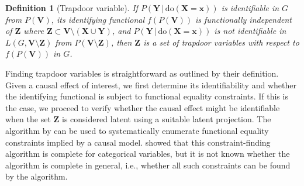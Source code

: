 \documentclass{statsoc}
\newcommand{\+}[1]{\ensuremath{\mathbf{#1}}}
\newtheorem{definition}{Definition}
\newcommand{\doo}{\textrm{do}}
\newcommand{\given}{{ \, | \, }}
\newcommand{\z}{trapdoor variable}
\begin{document}
\begin{definition}[Trapdoor variable] If ${P(\+ Y \given \doo(\+ X = \+ x))}$ is identifiable in $G$ from $P(\+ V)$, its identifying functional $f(P(\+ V))$ is functionally independent of $\+ Z$ where $\+ Z \subset \+ V \setminus (\+ X \cup \+ Y)$, and $P(\+ Y \given \doo(\+ X = \+ x))$ is not identifiable in $L(G, \+ V \setminus \+ Z)$ from $P(\+ V \setminus \+ Z)$, then $\+ Z$ is a set of \emph{\z s} with respect to $f(P(\+ V))$ in $G$.
\end{definition}
Finding \z s is straightforward as outlined by their definition. Given a causal effect of interest, we first determine its identifiability and whether the identifying functional is subject to functional equality constraints. If this is the case, we proceed to verify whether the causal effect might be identifiable when the set $\+ Z$ is considered latent using a suitable latent projection. The algorithm by \citet{TianPearl2002} can be used to systematically enumerate functional equality constraints implied by a causal model. \citet{evans2018} showed that this constraint-finding algorithm is complete for categorical variables, but it is not known whether the algorithm is complete in general, i.e., whether all such constraints can be found by the algorithm.
\end{document}
